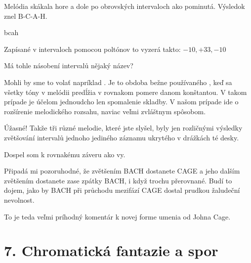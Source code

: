 \documentclass[12pt]{article}
\begin{document}
\begin{description}[itemsep=0pt]
\item[Ž:] Melódia skákala hore a dole po obrovských intervaloch ako pominutá. 
    Výsledok znel B-C-A-H.

\item[melodia] bcah

\item[Ž:] Zapísané v intervaloch pomocou poltónov to vyzerá takto: $-10, +33, -10$

\item[A:] Má tohle násobení intervalů nějaký název?

\item[Ž:] Mohli by sme to volať napríklad . Je to obdoba 
    bežne používaného , keď sa všetky tóny v melódii predĺžia 
    v rovnakom pomere danom konštantou. V takom prípade je účelom jednoudcho len 
    spomalenie skladby. V našom prípade ide o rozšírenie melodického rozsahu, naviac 
    veľmi zvláštnym spôsobom.

\item[A:] Úžasné! Takže tři různé melodie, které jste slyšel, byly jen rozličnými
    výsledky zvětšování intervalů jednoho jediného záznamu ukrytého v drážkách té desky.

\item[Ž:] Dospel som k rovnakému záveru ako vy.

\item[A:] Připadá mi pozoruhodné, že zvětšením BACH dostanete CAGE a jeho dalším
    zvětšením dostanete zase zpátky BACH, i když trochu přerovnané.
    Budí to dojem, jako by BACH při průchodu mezifází CAGE dostal prudkou žaludeční
    nevolnost.

\item[Ž:] To je teda veľmi príhodný komentár k novej forme umenia od Johna Cage.

\end{description}

\newpage
\section*{7. Chromatická fantazie a spor}
\end{document}
